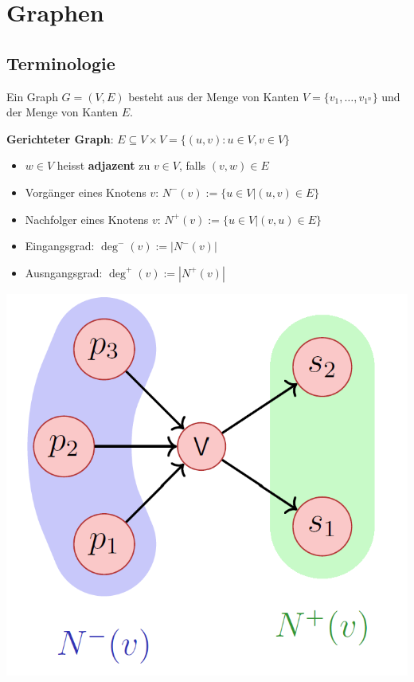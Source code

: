 \section{Graphen}

\begin{sectionbox}
\subsection{Terminologie}\smallskip
Ein Graph $G=(V,E)$ besteht aus der Menge von Kanten $V=\{v_{1},\ldots,v_{1^n}\}$ und der Menge von Kanten $E$.\par\smallskip

\textbf{Gerichteter Graph}: $E \subseteq V \times V=\{(u, v): u \in V, v \in V\}$\par
\begin{itemize}
    \item $w \in V$ heisst \textbf{adjazent} zu $v \in V$, falls $(v, w) \in E$
    \item Vorgänger eines Knotens $v$: $N^{-}(v):=\{u \in V |(u, v) \in E\}$
    \item Nachfolger eines Knotens $v$: $N^{+}(v):=\{u \in V |(v, u) \in E\}$
    \item Eingangsgrad: $\operatorname{deg}^{-}(v):=|N^{-}(v)|$
    \item Ausngangsgrad: $\operatorname{deg}^{+}(v):=|N^{+}(v)|$
\end{itemize}\par\smallskip
\begin{center}
    \includegraphics[width=0.5\columnwidth]{../img/gerGraph.png}
\end{center}\par\smallskip


\end{sectionbox}
